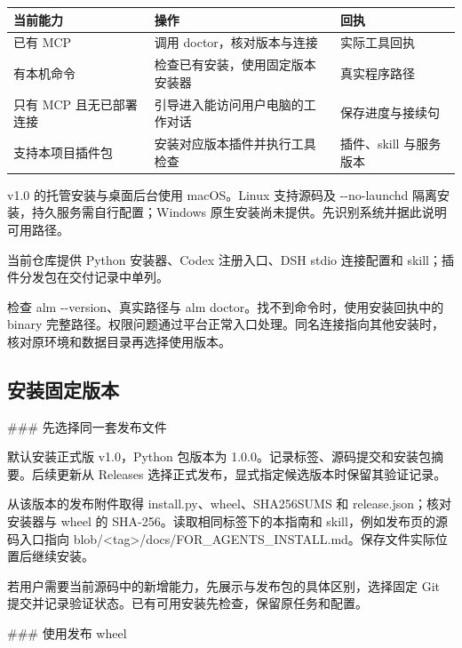 \documentclass[11pt,a4paper]{ctexart}
\begin{document}
\begin{longtable}{p{4.67cm}p{4.67cm}p{4.67cm}}
\toprule
当前能力 & 操作 & 回执 \\
\midrule\endhead
已有 MCP & 调用 doctor，核对版本与连接 & 实际工具回执 \\
有本机命令 & 检查已有安装，使用固定版本安装器 & 真实程序路径 \\
只有 MCP 且无已部署连接 & 引导进入能访问用户电脑的工作对话 & 保存进度与接续句 \\
支持本项目插件包 & 安装对应版本插件并执行工具检查 & 插件、skill 与服务版本 \\
\bottomrule
\end{longtable}


v1.0 的托管安装与桌面后台使用 macOS。Linux 支持源码及 -{}-no-launchd 隔离安装，持久服务需自行配置；Windows 原生安装尚未提供。先识别系统并据此说明可用路径。



当前仓库提供 Python 安装器、Codex 注册入口、DSH stdio 连接配置和 skill；插件分发包在交付记录中单列。



检查 alm -{}-version、真实路径与 alm doctor。找不到命令时，使用安装回执中的 binary 完整路径。权限问题通过平台正常入口处理。同名连接指向其他安装时，核对原环境和数据目录再选择使用版本。



\subsection{安装固定版本}


\#\#\# 先选择同一套发布文件



默认安装正式版 v1.0，Python 包版本为 1.0.0。记录标签、源码提交和安装包摘要。后续更新从 Releases 选择正式发布，显式指定候选版本时保留其验证记录。



从该版本的发布附件取得 install.py、wheel、SHA256SUMS 和 release.json；核对安装器与 wheel 的 SHA-256。读取相同标签下的本指南和 skill，例如发布页的源码入口指向 blob/\allowbreak{}<tag>/\allowbreak{}docs/\allowbreak{}FOR\_\allowbreak{}AGENTS\_\allowbreak{}INSTALL.md。保存文件实际位置后继续安装。



若用户需要当前源码中的新增能力，先展示与发布包的具体区别，选择固定 Git 提交并记录验证状态。已有可用安装先检查，保留原任务和配置。



\#\#\# 使用发布 wheel
\end{document}
